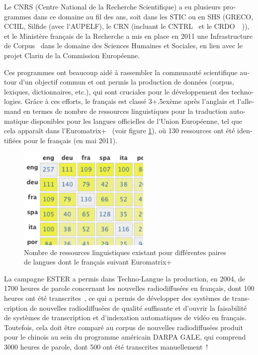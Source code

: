 \begin{french}
\begin{multicols}{2}
Le CNRS (Centre National de la Recherche Scientifique) a eu plusieurs
programmes dans ce domaine au fil des ans, soit dans les STIC ou en
SHS (GRECO, CCIIL, Silfide (avec l{\mbox '}AUPELF), le CRN (incluant le CNTRL~\cite{cnrtl}
et le CRDO~\cite{crdo}~\cite{crdo2})), et le Ministère français de la Recherche a mis en
place en 2011 une Infrastructure de Corpus~\cite{infracorpus} dans le domaine des
Sciences Humaines et Sociales, en lien avec le projet Clarin de la
Commission Européenne.

Ces programmes ont beaucoup aidé à rassembler la communauté
scientifique autour d{\mbox '}un objectif commun et ont permis la production
de données (corpus, lexiques, dictionnaires, etc.), qui sont cruciales
pour le développement des technologies. Grâce à ces efforts, le
français est classé 3\raise+.5ex\hbox{ème} après l{\mbox '}anglais et l{\mbox '}allemand en termes de
nombre de ressources linguistiques pour la traduction automatique
disponibles pour les langues officielles de l{\mbox '}Union Européenne, tel
que cela apparaît dans l{\mbox '}Euromatrix+~\cite{euromatrixplus} (voir figure \ref{fig:EuromatrixFrRessource}), où 130
ressources ont été identifiées pour le français (en mai 2011).

\begin{figure}
\begin{center}
\includegraphics[width=2.5in]{_media/french/french_table2_euromatrix.png}
\caption{Nombre de ressources linguistiques existant pour différentes paires de langues dont le français suivant Euromatrix+}
\label{fig:EuromatrixFrRessource}
\end{center}
\end{figure}

La campagne ESTER a permis dans Techno-Langue la production, en 2004,
de 1700 heures de parole concernant les nouvelles radiodiffusées en
français, dont 100 heures ont été transcrites~\cite{ester}, ce qui a permis de
développer des systèmes de transcription de nouvelles radiodiffusées
de qualité suffisante et d{\mbox '}ouvrir la faisabilité de systèmes de
transcription et d{\mbox '}indexation automatiques de vidéo en
français. Toutefois, cela doit être comparé au corpus de nouvelles
radiodiffusées produit pour le chinois au sein du programme américain
DARPA GALE, qui comprend 3000 heures de parole, dont 500 ont été
transcrites manuellement~\cite{gale}!


\end{multicols}
\end{french}
